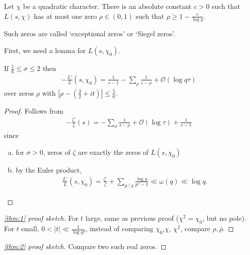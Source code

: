 \documentclass{article}
\newcommand{\1}{\mathbbm{1}}
\newcommand{\bigO}{\mathcal{O}}
\begin{document}
\begin{nthm}\label{thm:2}
  Let $\chi$ be a quadratic character. There is an absolute constant $c > 0$ such that $L(s,\chi)$ has at most one zero $\rho \in (0,1)$ such that $\rho \geq 1 - \frac{c}{\log q}$.
\end{nthm}
Such zeros are called `exceptional zeros' or `Siegel zeros'.

First, we need a lemma for $L(s,\chi_0)$.
\begin{nlemma}\label{lem:2}
  If $\frac 56 \leq \sigma \leq 2$ then
  \begin{align*}
    -\frac{L'}{L}(s,\chi_0) = \frac{1}{s-1} - \sum_\rho \frac{1}{s-\rho} + \bigO(\log q \tau)
  \end{align*}
  over zeros $\rho$ with $|\rho - (\frac 32 + it)| \leq \frac 56$.
\end{nlemma}
\begin{proof}
  Follows from
  \begin{align*}
    -\frac{\zeta'}{\zeta}(s) = -\sum_\rho \frac{1}{s-\rho} + \bigO(\log \tau) + \frac{1}{s-1}
  \end{align*}
  since
  \begin{enumerate}[(a)]
    \item for $\sigma > 0$, zeros of $\zeta$ are exactly the zeros of $L(s,\chi_0)$
    \item by the Euler product,
      \begin{align*}
        \frac{L'}{L}(s,\chi_0) = \frac{\zeta'}{\zeta} +\sum_{p \mid q} \frac{\log p}{p^s-1} \ll \omega(q) \ll \log q.
      \end{align*}
  \end{enumerate}
\end{proof}
\begin{proof}[\cref{thm:1} proof sketch]
  For $t$ large, same as previous proof ($\chi^2 = \chi_0$, but no pole).
  For $t$ small, $0 < |t| \ll \frac{1}{\log q \tau}$, instead of comparing $\chi_0$,$\chi$, $\chi^2$, compare $\rho, \bar{\rho}$.
\end{proof}
\begin{proof}[\cref{thm:2} proof sketch]
  Compare two such real zeros.
\end{proof}
\end{document}
